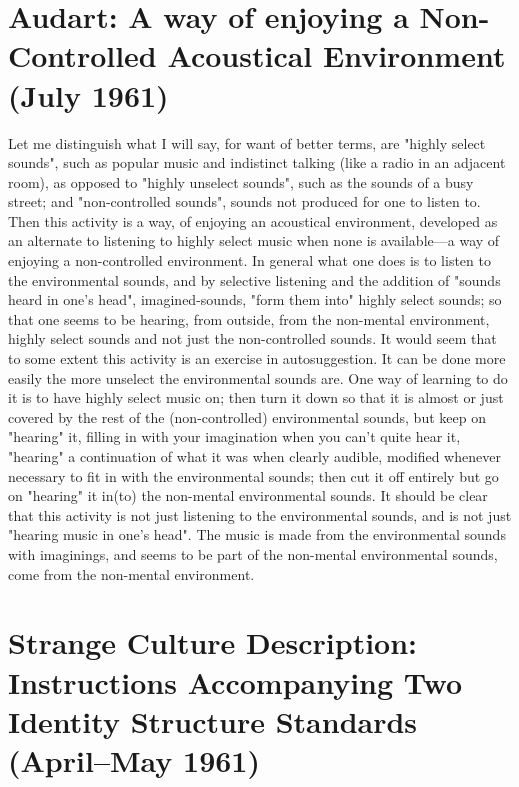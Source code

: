 \section[Audart: A way of enjoying a Non-Controlled Acoustical Environment (July 1961)][Audart: A way of enjoying a Non-Controlled Acoustical Environment]{Audart: A way of enjoying a Non-Controlled Acoustical Environment (July 1961)}
Let me distinguish what I will say, for want of better
terms, are "highly select sounds", such as popular music and 
indistinct talking (like a radio in an adjacent room), as 
opposed to "highly unselect sounds", such as the sounds of a
busy street; and "non-controlled sounds", sounds not produced
for one to listen to. Then this activity is a way, of enjoying
an acoustical environment, developed as an alternate to
listening to highly select music when none is available---a
way of enjoying a non-controlled environment. In general what
one does is to listen to the environmental sounds, and by
selective listening and the addition of "sounds heard in one's
head", imagined-sounds, "form them into" highly select sounds;
so that one seems to be hearing, from outside, from the non-mental
environment, highly select sounds and not just the non-controlled
sounds. It would seem that to some extent this 
activity is an exercise in autosuggestion. It can be done more
easily the more unselect the environmental sounds are. One way 
of learning to do it is to have highly select music on; then 
turn it down so that it is almost or just covered by the rest
of the (non-controlled) environmental sounds, but keep on 
"hearing" it, filling in with your imagination when you can't
quite hear it, "hearing" a continuation of what it was when 
clearly audible, modified whenever necessary to fit in with 
the environmental sounds; then cut it off entirely but go on 
"hearing" it in(to) the non-mental environmental sounds. It 
should be clear that this activity is not just listening to the
environmental sounds, and is not just "hearing music in one's 
head". The music is made from the environmental sounds with
imaginings, and seems to be part of the non-mental environmental
sounds, come from the non-mental environment. 

\clearpage
\section[Strange Culture Description: Instructions Accompanying Two Identity Structure Standards (April--May 1961)][Strange Culture Description: Instructions Accompanying Two Identity Structure Standards]{Strange Culture Description: Instructions Accompanying Two Identity Structure Standards (April--May 1961)}

